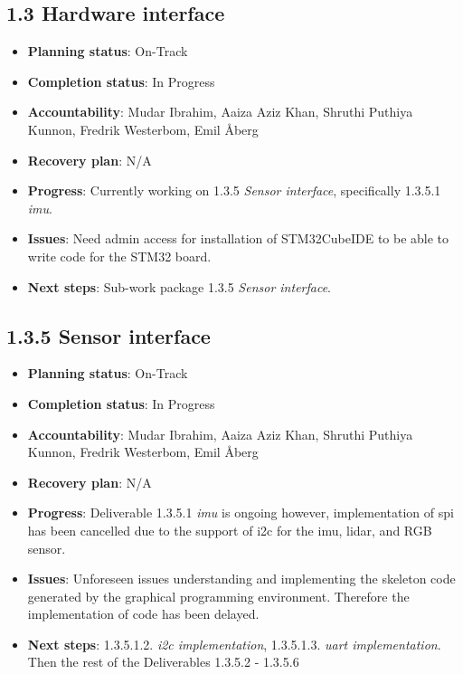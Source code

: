 
\subsection*{1.3 Hardware interface}
\begin{itemize}
    \item \textbf{Planning status}: On-Track
    \item \textbf{Completion status}: In Progress
    \item \textbf{Accountability}: Mudar Ibrahim, Aaiza Aziz Khan, Shruthi Puthiya Kunnon, Fredrik Westerbom, Emil Åberg
    \item \textbf{Recovery plan}: N/A
    \item \textbf{Progress}: Currently working on 1.3.5 \textit{Sensor interface}, specifically 1.3.5.1 \textit{\acs{imu}}. 
    \item \textbf{Issues}: Need admin access for installation of STM32CubeIDE to be able to write code for the STM32 board.
    \item \textbf{Next steps}: Sub-work package 1.3.5 \textit{Sensor interface}. 
\end{itemize}


\subsection*{1.3.5 Sensor interface}
\begin{itemize}
    \item \textbf{Planning status}: On-Track
    \item \textbf{Completion status}: In Progress
    \item \textbf{Accountability}: Mudar Ibrahim, Aaiza Aziz Khan, Shruthi Puthiya Kunnon, Fredrik Westerbom, Emil Åberg
    \item \textbf{Recovery plan}: N/A
    \item \textbf{Progress}: Deliverable 1.3.5.1 \textit{\acs{imu}} is ongoing however, implementation of \ac{spi} has been cancelled due to the support of \ac{i2c} for the \acs{imu}, \ac{lidar}, and RGB sensor. 
    \item \textbf{Issues}: Unforeseen issues understanding and implementing the skeleton code generated by the graphical programming environment. Therefore the implementation of code has been delayed.
    \item \textbf{Next steps}: 1.3.5.1.2. \textit{\acs{i2c} implementation}, 1.3.5.1.3. \textit{\acs{uart} implementation}. Then the rest of the Deliverables 1.3.5.2 - 1.3.5.6
\end{itemize}

